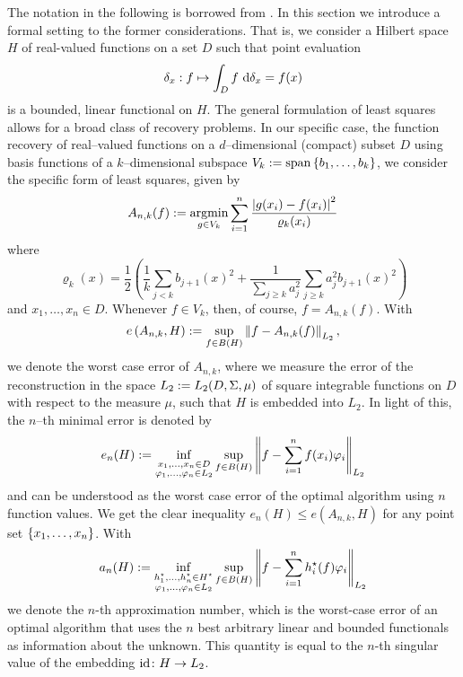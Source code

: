 \documentclass[12pt, oneside]{amsart}
\theoremstyle{definition}
\theoremstyle{remark}
\numberwithin{equation}{section}
\begin{document}
The notation in the following is borrowed from \cite{Ullrich_2020}.
In this section we introduce a formal setting to the former considerations. That is, we consider a Hilbert space \(H\) of real-valued functions on a set \(D\) such that point evaluation \[
    \delta_x: f \mapsto \int_D f\ \d \delta_x = f(x)
\]
is a bounded, linear functional on \(H\).
The general formulation of least squares allows for a broad class of recovery problems. In our specific case, the function recovery of real--valued functions on a \(d\)--dimensional (compact) subset \(D\) using basis functions of a \(k\)--dimensional subspace \(V_k \defn \spn \set{b_1, \dots, b_k}\), we consider the specific form of least squares, given by\[
    A_{n, k}(f) \defn \argmin_{g \in V_k} \sum_{i=1}^n \frac{\abs{g(x_i) - f(x_i)}^2}{\varrho_k(x_i)}
\]
where \[
    \varrho_k(x) = \frac{1}{2} \left( \frac{1}{k} \sum_{j < k} b_{j+1}(x)^2 + \frac{1}{\sum_{j \geq k} a_j^2} \sum_{j \geq k} a_j^2 b_{j+1}(x)^2 \right)
\]
and \(x_1, \dots, x_n \in D\). Whenever \(f \in V_k\), then, of course, \(f = A_{n, k}(f)\). With
\begin{equation}\label{eq:worstCaseError}
    e\left(A_{n,k}, H\right) \defn \sup_{f \in B(H)} \norm[L_2]{f - A_{n,k}(f)},
\end{equation}
we denote the worst case error of \(A_{n,k}\), where we measure the error of the reconstruction in the space \(L_2 \defn L_2(D, \Sigma, \mu)\) of square integrable functions on \(D\) with respect to the measure \(\mu\), such that \(H\) is embedded into \(L_2\). In light of this, the \(n\)--th minimal error is denoted by \[
    e_n(H) \defn \inf_{\substack{x_1, \dots, x_n \in D \\ \phi_1, \dots, \phi_n 
    \in L_2}} \sup_{f \in B(H)} \norm[L_2]{f - \sum_{i=1}^n f(x_i) \phi_i}
\]
and can be understood as the worst case error of the optimal algorithm using \(n\) function values. We get the clear inequality \(e_n(H) \leq e(A_{n,k}, H)\) for any point set \(\set{x_1, \dots, x_n}\). With \[
    a_n(H) \defn \inf_{\substack{h_1^\star, \dots, h_n^\star \in H^\star \\ 
    \phi_1, \dots, \phi_n \in L_2}} \sup_{f \in B(H)} \norm[L_2]{f - 
    \sum_{i=1}^n h_i^\star(f) \phi_i}
\]
we denote the \(n\)-th approximation number, which is the worst-case error of 
an optimal algorithm that uses the \(n\) best arbitrary linear and bounded 
functionals as information about the unknown. This quantity is equal to the 
\(n\)-th singular value of the embedding \(\id\from H \to L_2\).
\end{document}
